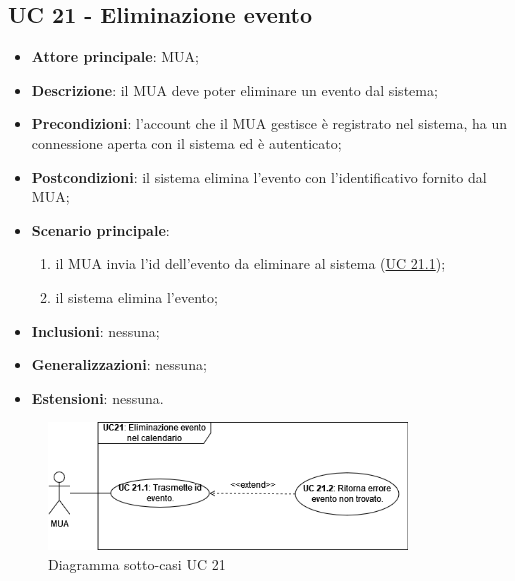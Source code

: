 \subsection{UC 21 - Eliminazione evento} \label{sec:UC21}
    \begin{itemize}
        \item \textbf{Attore principale}: MUA;
        \item \textbf{Descrizione}: il MUA deve poter eliminare un evento dal sistema;
        \item \textbf{Precondizioni}: l’account che il MUA gestisce è registrato nel sistema, ha un connessione aperta con il sistema ed è autenticato;
        \item \textbf{Postcondizioni}: il sistema elimina l'evento con l'identificativo fornito dal MUA;
        \item \textbf{Scenario principale}:
            \begin{enumerate}
                \item il MUA invia l'id dell'evento da eliminare al sistema (\hyperref[sec:UC21.1]{UC 21.1});
                \item il sistema elimina l'evento;
            \end{enumerate}
        \item \textbf{Inclusioni}: nessuna;
        \item \textbf{Generalizzazioni}: nessuna;
        \item \textbf{Estensioni}: nessuna.
    \end{itemize}

\begin{figure}[h]
    \includegraphics[width=0.85\textwidth]{sections/uc_imgs/UC21.png}
    \centering
    \caption{Diagramma sotto-casi UC 21}
\end{figure}

